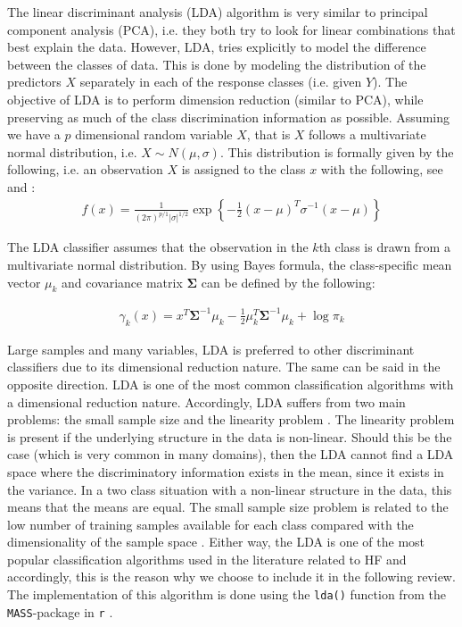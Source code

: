 \documentclass[../thesis.tex]{subfiles}
\begin{document}
\noindent The linear discriminant analysis (LDA) algorithm is very similar to principal component analysis (PCA), i.e. they both try to look for linear combinations that best explain the data. However, LDA, tries explicitly to model the difference between the classes of data. This is done by modeling the distribution of the predictors $X$ separately in each of the response classes (i.e. given $Y$). The objective of LDA is to perform dimension reduction (similar to PCA), while preserving as much of the class discrimination information as possible. Assuming we have a $p$ dimensional random variable $X$, that is $X$ follows a multivariate normal distribution, i.e. $X \sim N(\mu,\sigma)$. This distribution is formally given by the following, i.e. an observation $X$ is assigned to the class $x$ with the following, see \cite{friedman2009elements} and \cite{james2013introduction}:
\begin{align}
    f(x) = \frac{1}{(2\pi)^{p / 1}|\sigma|^{1/2}} \exp\left \{-\frac{1}{2}(x-\mu)^T \sigma^{-1} (x - \mu) \right \}
\end{align}

\noindent The LDA classifier assumes that the observation in the $k$th class is drawn from a multivariate normal distribution. By using Bayes formula, the class-specific mean vector $\mu_k$ and covariance matrix $\boldsymbol{\Sigma}$ can be defined by the following:

\begin{align}
    \gamma_k (x) = x^T\boldsymbol{\Sigma}^{-1} \mu_k - \frac{1}{2}\mu_k^T\boldsymbol{\Sigma}^{-1} \mu_k + \log \pi_k
\end{align}

\noindent Large samples and many variables, LDA is preferred to other discriminant classifiers due to its dimensional reduction nature. The same can be said in the opposite direction. LDA is one of the most common classification algorithms with a dimensional reduction nature. Accordingly, LDA suffers from two main problems: the small sample size and the linearity problem \citep{tharwat2017linear}. The linearity problem is present if the underlying structure in the data is non-linear. Should this be the case (which is very common in many domains), then the LDA cannot find a LDA space where the discriminatory information exists in the mean, since it exists in the variance. In a two class situation with a non-linear structure in the data, this means that the means are equal. The small sample size problem is related to the low number of training samples available for each class compared with the dimensionality of the sample space \citep{tharwat2017linear}. Either way, the LDA is one of the most popular classification algorithms used in the literature related to HF and accordingly, this is the reason why we choose to include it in the following review. The implementation of this algorithm is done using the \texttt{lda()} function from the \texttt{MASS}-package in \texttt{r} \citep{MASS}.
\end{document}
